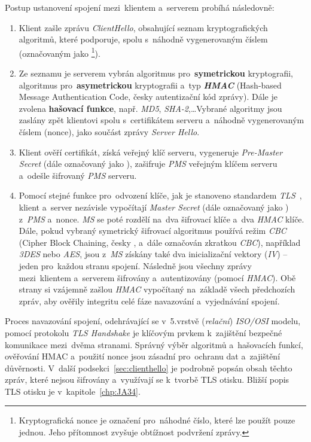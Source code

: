 Postup ustanovení spojení mezi~klientem a~serverem probíhá následovně:
\begin{enumerate}
	\item Klient zašle zprávu \textit{ClientHello}, obsahující seznam kryptografických algoritmů, které podporuje, spolu s~náhodně vygenerovaným číslem (označovaným jako \footnote{Kryptografická nonce je označení pro~náhodné číslo, které lze použít pouze jednou. Jeho přítomnost zvyšuje obtížnost podvržení zprávy.}).
	\item Ze seznamu je serverem vybrán algoritmus pro~\textbf{symetrickou} kryptografii, algoritmus pro~\textbf{asymetrickou} kryptografii a~typ \textbf{\textit{HMAC}} (Hash-based Message Authentication Code, česky autentizační kód zprávy). Dále je zvolena \textbf{hašovací funkce}, např. \textit{MD5}, \textit{SHA-2},\dots Vybrané algoritmy jsou zaslány zpět klientovi spolu s~certifikátem serveru a~náhodně vygenerovaným číslem (nonce), jako součást zprávy \textit{Server Hello}.
	\item Klient ověří certifikát, získá veřejný klíč serveru, vygeneruje \textit{Pre-Master Secret} (dále označovaný jako ), zašifruje \textit{PMS} veřejným klíčem serveru a~odešle šifrovaný \textit{PMS} serveru.
	\item Pomocí stejné funkce pro~odvození klíče, jak je stanoveno standardem \textit{TLS}~\cite{rfc-tls12}, klient a~server nezávisle vypočítají \textit{Master Secret} (dále označovaný jako ) z~\textit{PMS} a~nonce. \textit{MS} se poté rozdělí na~dva šifrovací klíče a~dva \textit{HMAC} klíče. Dále, pokud vybraný symetrický šifrovací algoritmus používá režim \textit{CBC} (Cipher Block Chaining, česky , a~dále označován zkratkou \textit{CBC}), například \textit{3DES} nebo \textit{AES}, jsou z~\textit{MS} získány také dva inicializační vektory (\textit{IV}) --jeden pro~každou stranu spojení. Následně jsou všechny zprávy mezi~klientem a~serverem šifrovány a~autentizovány (pomocí \textit{HMAC}). Obě strany si vzájemně zašlou \textit{HMAC} vypočítaný na~základě všech předchozích zpráv, aby ověřily integritu celé fáze navazování a~vyjednávání spojení.
\end{enumerate}

Proces navazování spojení, odehrávající se v~5.vrstvě (\textit{relační}) \textit{ISO/OSI} modelu, pomocí protokolu \textit{TLS Handshake} je klíčovým prvkem k~zajištění bezpečné komunikace mezi~dvěma stranami. Správný výběr algoritmů a~hašovacích funkcí, ověřování HMAC a~použití nonce jsou zásadní pro~ochranu dat a~zajištění důvěrnosti. V~další podsekci~\ref{sec:clienthello} je podrobně popsán obsah těchto zpráv, které nejsou šifrovány a~využívají se k~tvorbě TLS otisku. Bližší popis TLS otisku je v~kapitole~\ref{chp:JA34}.

